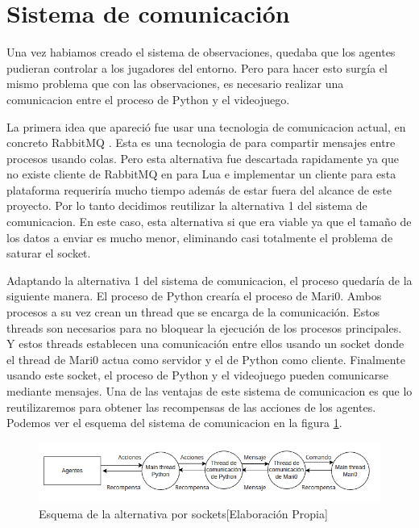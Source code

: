 \section{Sistema de comunicación}

Una vez habiamos creado el sistema de observaciones, quedaba que los agentes pudieran controlar a los jugadores del entorno. Pero para hacer esto surgía el mismo problema que con las observaciones, es necesario realizar una comunicacion entre el proceso de Python y el videojuego.

La primera idea que apareció fue usar una tecnologia de comunicacion actual, en concreto RabbitMQ \cite {RabbitMQ}. Esta es una tecnologia de para compartir mensajes entre procesos usando colas. Pero esta alternativa fue descartada rapidamente ya que no existe cliente de RabbitMQ en para Lua e implementar un cliente para esta plataforma requeriría mucho tiempo además de estar fuera del alcance de este proyecto. Por lo tanto decidimos reutilizar la alternativa 1 del sistema de comunicacion. En este caso, esta alternativa si que era viable ya que el tamaño de los datos a enviar es mucho menor, eliminando casi totalmente el problema de saturar el socket.

Adaptando la alternativa 1 del sistema de comunicacion, el proceso quedaría de la siguiente manera. El proceso de Python crearía el proceso de Mari0. Ambos procesos a su vez crean un thread que se encarga de la comunicación. Estos threads son necesarios para no bloquear la ejecución de los procesos principales. Y estos threads establecen una comunicación entre ellos usando un socket donde el thread de Mari0 actua como servidor y el de Python como cliente. Finalmente usando este socket, el proceso de Python y el videojuego pueden comunicarse mediante mensajes. Una de las ventajas de este sistema de comunicacion es que lo reutilizaremos para obtener las recompensas de las acciones de los agentes. Podemos ver el esquema del sistema de comunicacion en la figura \ref {fig:alternativa-1-acc}. 

\begin{figure}[ht]
    \centering
    \includegraphics[width=1.0\textwidth]{img/comunication.png}
    \caption{Esquema de la alternativa por sockets[Elaboración Propia]}
    \label{fig:alternativa-1-acc}
\end{figure}


